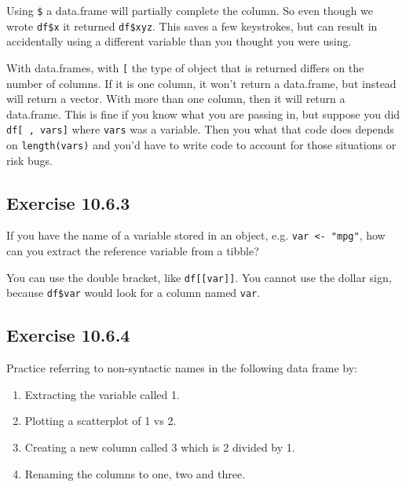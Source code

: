 \documentclass[]{book}
\providecommand{\tightlist}{%
  \setlength{\itemsep}{0pt}\setlength{\parskip}{0pt}}
\theoremstyle{plain}
\theoremstyle{remark}
\begin{document}
Using \texttt{\$} a data.frame will partially complete the column. So
even though we wrote \texttt{df\$x} it returned \texttt{df\$xyz}. This
saves a few keystrokes, but can result in accidentally using a different
variable than you thought you were using.

With data.frames, with \texttt{{[}} the type of object that is returned
differs on the number of columns. If it is one column, it won't return a
data.frame, but instead will return a vector. With more than one column,
then it will return a data.frame. This is fine if you know what you are
passing in, but suppose you did \texttt{df{[}\ ,\ vars{]}} where
\texttt{vars} was a variable. Then you what that code does depends on
\texttt{length(vars)} and you'd have to write code to account for those
situations or risk bugs.

\hypertarget{exercise-10.6.3}{%
\subsection*{\texorpdfstring{Exercise
{10.6.3}}{Exercise 10.6.3}}\label{exercise-10.6.3}}

If you have the name of a variable stored in an object, e.g.
\texttt{var\ \textless{}-\ "mpg"}, how can you extract the reference
variable from a tibble?

You can use the double bracket, like \texttt{df{[}{[}var{]}{]}}. You
cannot use the dollar sign, because \texttt{df\$var} would look for a
column named \texttt{var}.

\hypertarget{exercise-10.6.4}{%
\subsection*{\texorpdfstring{Exercise
{10.6.4}}{Exercise 10.6.4}}\label{exercise-10.6.4}}

Practice referring to non-syntactic names in the following data frame
by:

\begin{enumerate}
\def\labelenumi{\arabic{enumi}.}
\tightlist
\item
  Extracting the variable called 1.
\item
  Plotting a scatterplot of 1 vs 2.
\item
  Creating a new column called 3 which is 2 divided by 1.
\item
  Renaming the columns to one, two and three.
\end{enumerate}
\end{document}
